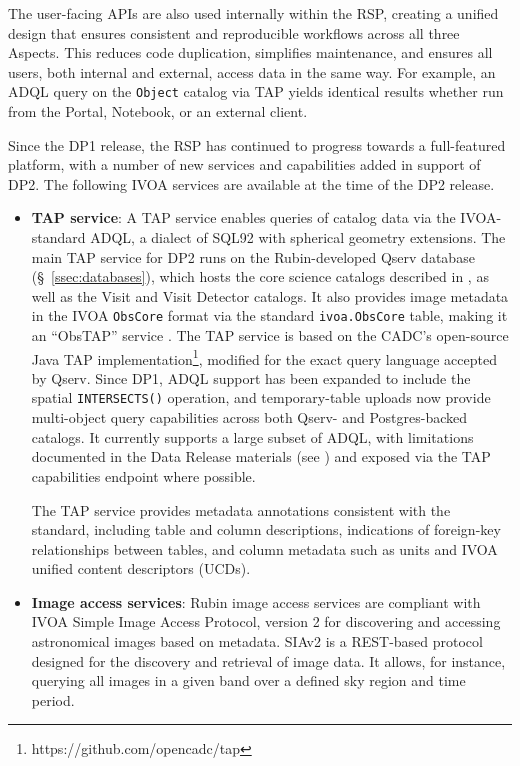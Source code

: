 The user-facing \glspl{API} are also used internally within the \gls{RSP}, creating a unified design that ensures consistent and reproducible workflows across all three Aspects.
This reduces code duplication, simplifies maintenance, and ensures all users, both internal and external, access data in the same way.
For example, an \gls{ADQL} query on the \texttt{Object} catalog via \gls{TAP} yields identical results whether run from the Portal, Notebook, or an external client.

Since the \gls{DP1} release, the \gls{RSP} has continued to progress towards a full-featured platform, with a number of new services and capabilities added in support of \gls{DP2}.
The following \gls{IVOA} services are available at the time of the \gls{DP2} release.
\begin{itemize}
\vspace{0.1cm}
\item \textbf{\gls{TAP} service}: A TAP service \citep[][]{2019ivoa.spec.0927D} enables queries of catalog data via the IVOA-standard \gls{ADQL}, a dialect of SQL92 with spherical geometry extensions.
The main \gls{TAP} service for \gls{DP2} runs on the Rubin-developed \gls{Qserv} database (\S~\ref{ssec:databases}), which hosts the core science catalogs described in , as well as the \gls{Visit} and \gls{Visit} Detector catalogs.
It also provides image metadata in the IVOA \texttt{ObsCore} format via the standard \texttt{ivoa.ObsCore} table, making it an ``ObsTAP'' service \citep[][]{2017ivoa.spec.0509L}.
The TAP service is based on the \gls{CADC}'s open-source Java TAP implementation\footnote{https://github.com/opencadc/tap}, modified for the exact query language accepted by \gls{Qserv}.
Since \gls{DP1}, ADQL support has been expanded to include the spatial \texttt{INTERSECTS()} operation, and temporary-table uploads now provide multi-object query capabilities across both \gls{Qserv}- and Postgres-backed catalogs.
It currently supports a large subset of ADQL, with limitations documented in the \gls{Data Release} materials (see ) and exposed via the TAP capabilities endpoint where possible.

The TAP service provides \gls{metadata} annotations consistent with the standard, including table and column descriptions, indications of foreign-key relationships between tables, and column \gls{metadata} such as units and \gls{IVOA} unified content descriptors (UCDs).

\vspace{0.1cm}
\item \textbf{Image access services}: Rubin image access services are compliant with \gls{IVOA} Simple Image Access Protocol, version 2 \citep[SIAv2;][]{2025arXiv250100544J,2015ivoa.spec.1223D}
for discovering and accessing astronomical images based on \gls{metadata}.
SIAv2 is a \gls{REST}-based protocol designed for the discovery and retrieval of image data.
It allows, for instance, querying all images in a given band over a defined sky region and time period.


\end{itemize}
